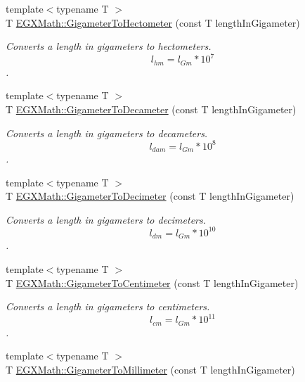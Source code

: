 \begin{DoxyCompactItemize}
{\footnotesize template$<$typename T $>$ }\\T \mbox{\hyperlink{group___e_g_x_math-_conversions-_length_conversions-_s_i-_gigameter-_s_i_ga25121199c511ed43c20fa9c9bdefc0ca}{E\+G\+X\+Math\+::\+Gigameter\+To\+Hectometer}} (const T length\+In\+Gigameter)
\begin{DoxyCompactList}\small\item\em Converts a length in gigameters to hectometers. \[ l_{hm}=l_{Gm} * 10^{7} \]. \end{DoxyCompactList}\item 
{\footnotesize template$<$typename T $>$ }\\T \mbox{\hyperlink{group___e_g_x_math-_conversions-_length_conversions-_s_i-_gigameter-_s_i_gab0233167d63c136801ae42faabe64263}{E\+G\+X\+Math\+::\+Gigameter\+To\+Decameter}} (const T length\+In\+Gigameter)
\begin{DoxyCompactList}\small\item\em Converts a length in gigameters to decameters. \[ l_{dam}=l_{Gm} * 10^{8} \]. \end{DoxyCompactList}\item 
{\footnotesize template$<$typename T $>$ }\\T \mbox{\hyperlink{group___e_g_x_math-_conversions-_length_conversions-_s_i-_gigameter-_s_i_ga9333dddd3642cf160b026516dd760576}{E\+G\+X\+Math\+::\+Gigameter\+To\+Decimeter}} (const T length\+In\+Gigameter)
\begin{DoxyCompactList}\small\item\em Converts a length in gigameters to decimeters. \[ l_{dm}=l_{Gm} * 10^{10} \]. \end{DoxyCompactList}\item 
{\footnotesize template$<$typename T $>$ }\\T \mbox{\hyperlink{group___e_g_x_math-_conversions-_length_conversions-_s_i-_gigameter-_s_i_gac0fc033ff4b887e157a333cde344b824}{E\+G\+X\+Math\+::\+Gigameter\+To\+Centimeter}} (const T length\+In\+Gigameter)
\begin{DoxyCompactList}\small\item\em Converts a length in gigameters to centimeters. \[ l_{cm}=l_{Gm} * 10^{11} \]. \end{DoxyCompactList}\item 
{\footnotesize template$<$typename T $>$ }\\T \mbox{\hyperlink{group___e_g_x_math-_conversions-_length_conversions-_s_i-_gigameter-_s_i_ga91b617f8bf6330f1379d3372e4968254}{E\+G\+X\+Math\+::\+Gigameter\+To\+Millimeter}} (const T length\+In\+Gigameter)

\end{DoxyCompactItemize}
